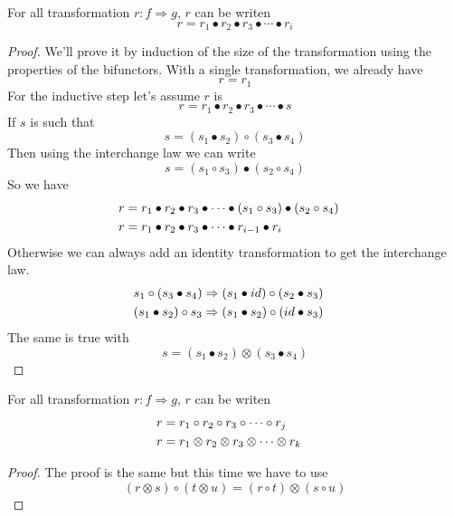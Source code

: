 \documentclass[a4paper]{article}
\begin{document}
\begin{proposition}
For all transformation $r: f \Rightarrow g$, $r$ can be writen
\[
r = r_1 \bullet r_2 \bullet r_3 \bullet \cdots \bullet r_i
\]

\begin{proof}
We'll prove it by induction of the size of the transformation using the properties of the bifunctors.
With a single transformation, we already have
\[
r = r_1
\]
For the inductive step let's assume $r$ is
\[
r = r_1 \bullet r_2 \bullet r_3 \bullet \cdots \bullet s
\]
If $s$ is such that
\[
s = (s_1 \bullet s_2) \circ (s_3 \bullet s_4)
\]
Then using the interchange law we can write
\[
s = (s_1 \circ s_3) \bullet (s_2 \circ s_4)
\]
So we have 
\begin{align}
r &= r_1 \bullet r_2 \bullet r_3 \bullet \cdots \bullet (s_1 \circ s_3) \bullet (s_2 \circ s_4) \cr
r &= r_1 \bullet r_2 \bullet r_3 \bullet \cdots \bullet r_{i - 1} \bullet r_i
\end{align}
Otherwise we can always add an identity transformation to get the interchange law.
\begin{align}
s_1 \circ (s_3 \bullet s_4) &\Rightarrow (s_1 \bullet id) \circ (s_2 \bullet s_3) \cr
(s_1 \bullet s_2) \circ s_3 &\Rightarrow (s_1 \bullet s_2) \circ (id \bullet s_3)
\end{align}
The same is true with
\[
s = (s_1 \bullet s_2) \otimes (s_3 \bullet s_4)
\]
\end{proof}
\end{proposition}

\begin{proposition}
For all transformation $r: f \Rightarrow g$, $r$ can be writen
\begin{align}
r &= r_1 \circ r_2 \circ r_3 \circ \cdots \circ r_j \cr
r &= r_1 \otimes r_2 \otimes r_3 \otimes \cdots \otimes r_k
\end{align}

\begin{proof}
The proof is the same but this time we have to use
\[
(r \otimes s) \circ (t \otimes u) = (r \circ t) \otimes (s \circ u)
\]
\end{proof}
\end{proposition}
\end{document}
